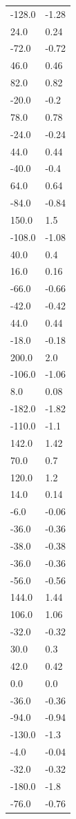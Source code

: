 \begin{longtable}{ll}
-128.0 & -1.28 \\
24.0 & 0.24 \\
-72.0 & -0.72 \\
46.0 & 0.46 \\
82.0 & 0.82 \\
-20.0 & -0.2 \\
78.0 & 0.78 \\
-24.0 & -0.24 \\
44.0 & 0.44 \\
-40.0 & -0.4 \\
64.0 & 0.64 \\
-84.0 & -0.84 \\
150.0 & 1.5 \\
-108.0 & -1.08 \\
40.0 & 0.4 \\
16.0 & 0.16 \\
-66.0 & -0.66 \\
-42.0 & -0.42 \\
44.0 & 0.44 \\
-18.0 & -0.18 \\
200.0 & 2.0 \\
-106.0 & -1.06 \\
8.0 & 0.08 \\
-182.0 & -1.82 \\
-110.0 & -1.1 \\
142.0 & 1.42 \\
70.0 & 0.7 \\
120.0 & 1.2 \\
14.0 & 0.14 \\
-6.0 & -0.06 \\
-36.0 & -0.36 \\
-38.0 & -0.38 \\
-36.0 & -0.36 \\
-56.0 & -0.56 \\
144.0 & 1.44 \\
106.0 & 1.06 \\
-32.0 & -0.32 \\
30.0 & 0.3 \\
42.0 & 0.42 \\
0.0 & 0.0 \\
-36.0 & -0.36 \\
-94.0 & -0.94 \\
-130.0 & -1.3 \\
-4.0 & -0.04 \\
-32.0 & -0.32 \\
-180.0 & -1.8 \\
-76.0 & -0.76 \\

\end{longtable}
